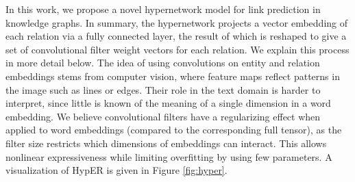 \documentclass[runningheads]{llncs}
\begin{document}
In this work, we propose a novel hypernetwork model for link prediction in knowledge graphs. In summary, the hypernetwork projects a vector embedding of each relation via a fully connected layer, the result of which is reshaped to give a set of convolutional filter weight vectors for each relation. We explain this process in more detail below. The idea of using convolutions on entity and relation embeddings stems from computer vision, where feature maps reflect patterns in the image such as lines or edges. Their role in the text domain is harder to interpret, since little is known of the meaning of a single dimension in a word embedding. We believe convolutional filters have a regularizing effect when applied to word embeddings (compared to the corresponding full tensor), as the filter size restricts which dimensions of embeddings can interact. This allows nonlinear expressiveness while limiting overfitting by using few parameters. A visualization of  HypER  is given in Figure \ref{fig:hyper}.
\end{document}

